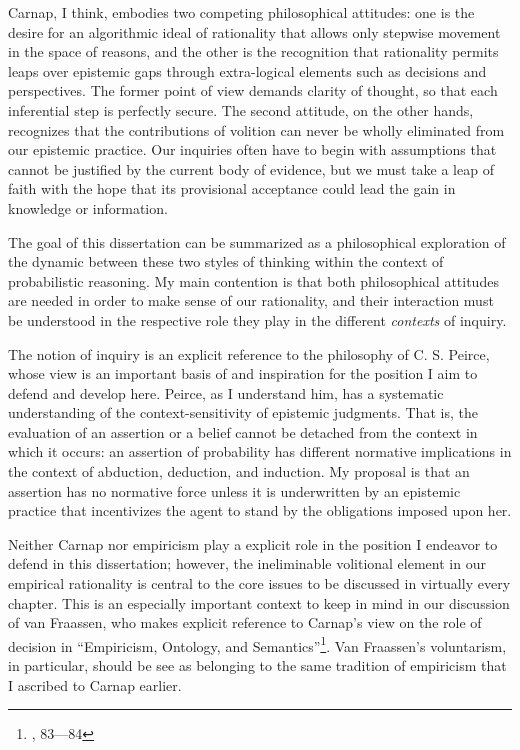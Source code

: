 Carnap, I think, embodies two competing philosophical attitudes: one is
the desire for an algorithmic ideal of rationality that allows only  stepwise movement in the space of reasons, and the other is the
recognition that rationality permits leaps over epistemic gaps through extra-logical elements such as decisions and perspectives. The former point of
view demands clarity of thought, so that each inferential step is
perfectly secure. The second attitude, on the other hands, recognizes that the contributions of volition can never be wholly eliminated from our epistemic practice. Our inquiries often have to begin with assumptions that cannot be justified by the current body of evidence, but we must take a leap of faith with the hope that its provisional acceptance could lead the gain in knowledge or information.

The goal of this dissertation can be summarized as a philosophical
exploration of the dynamic between these two styles of thinking within
the context of probabilistic reasoning. My main contention is that both
philosophical attitudes are needed in order to make sense of our rationality, and
their interaction must be understood in the respective role they play in
the different \emph{contexts} of inquiry.

The notion of inquiry is an explicit reference to the philosophy of C.
S. Peirce, whose view is an important basis of and inspiration for the
position I aim to defend and develop here. Peirce, as I understand him,
has a systematic understanding of the context-sensitivity of epistemic
judgments. That is, the evaluation of an assertion or a belief cannot be
detached from the context in which it occurs: an assertion of
probability has different normative implications in the context of
abduction, deduction, and induction. My proposal is that an
assertion has no normative force unless it is underwritten by an
epistemic practice that incentivizes the agent to stand by the
obligations imposed upon her.

Neither Carnap nor empiricism play a explicit role in the position I endeavor to defend in this dissertation; however, the ineliminable volitional element in our empirical rationality is central to the core issues to be discussed in virtually every chapter. This is an especially important context to keep in mind in our discussion of van Fraassen, who makes explicit reference to Carnap's view on the role of decision in ``Empiricism, Ontology, and Semantics''\footnote{\cite{antinatural}, 83---84}. Van Fraassen's voluntarism, in particular, should be see as belonging to the same tradition of empiricism that I ascribed to Carnap earlier.




